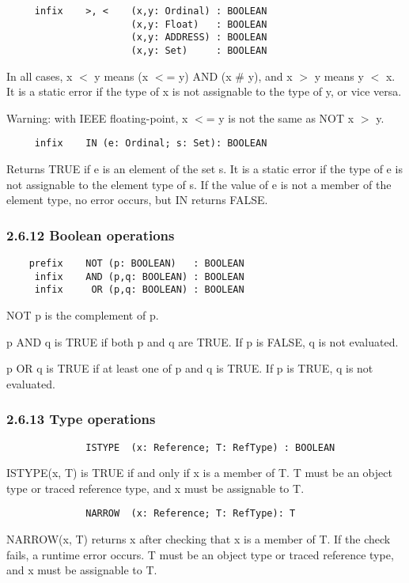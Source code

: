 \documentclass[10pt]{article}
\begin{document}
\begin{verbatim}
     infix    >, <    (x,y: Ordinal) : BOOLEAN
                      (x,y: Float)   : BOOLEAN
                      (x,y: ADDRESS) : BOOLEAN
                      (x,y: Set)     : BOOLEAN
\end{verbatim}
In all cases, x $<$ y means (x $<$= y) AND (x \# y), and x $>$ y means y $<$
x. It is a static error if the type of x is not assignable to the type of y,
or vice versa.

Warning: with IEEE floating-point, x $<$= y is not the same as NOT x $>$ y.

\begin{verbatim}
     infix    IN (e: Ordinal; s: Set): BOOLEAN
\end{verbatim}
Returns TRUE if e is an element of the set s. It is a static error if the type
of e is not assignable to the element type of s. If the value of e is not a
member of the element type, no error occurs, but IN returns FALSE.

\subsubsection*{2.6.12 Boolean operations}

\begin{verbatim}
    prefix    NOT (p: BOOLEAN)   : BOOLEAN
     infix    AND (p,q: BOOLEAN) : BOOLEAN
     infix     OR (p,q: BOOLEAN) : BOOLEAN
\end{verbatim}
NOT p is the complement of p.

p AND q is TRUE if both p and q are TRUE. If p is FALSE, q is not evaluated.

p OR q is TRUE if at least one of p and q is TRUE. If p is TRUE, q is not
evaluated.

\subsubsection*{2.6.13 Type operations}

\begin{verbatim}
              ISTYPE  (x: Reference; T: RefType) : BOOLEAN
\end{verbatim}
ISTYPE(x, T) is TRUE if and only if x is a member of T. T must be an object
type or traced reference type, and x must be assignable to T.
\begin{verbatim}
              NARROW  (x: Reference; T: RefType): T
\end{verbatim}
NARROW(x, T) returns x after checking that x is a member of T. If the check
fails, a runtime error occurs. T must be an object type or traced reference
type, and x must be assignable to T.
\end{document}
